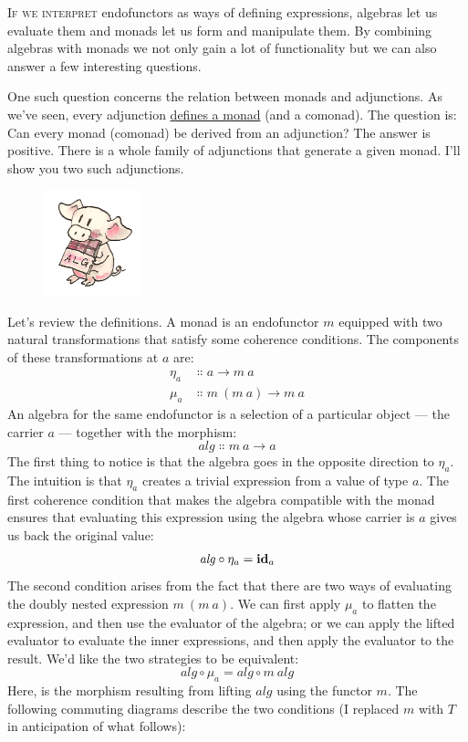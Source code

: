 
\lettrine[lhang=0.17]{I}{f we interpret} endofunctors as ways of defining expressions, algebras
let us evaluate them and monads let us form and manipulate them. By
combining algebras with monads we not only gain a lot of functionality
but we can also answer a few interesting questions.

One such question concerns the relation between monads and adjunctions.
As we've seen, every adjunction \hyperref[monads-categorically]{defines
  a monad} (and a comonad). The question is: Can every monad (comonad) be
derived from an adjunction? The answer is positive. There is a whole
family of adjunctions that generate a given monad. I'll show you two
such adjunctions.

\begin{figure}[H]
  \centering
  \includegraphics[width=0.25\textwidth]{images/pigalg.png}
\end{figure}

\noindent
Let's review the definitions. A monad is an endofunctor $m$
equipped with two natural transformations that satisfy some coherence
conditions. The components of these transformations at $a$ are:
\begin{align*}
  \eta_a & \Colon a \to m\ a         \\
  \mu_a  & \Colon m\ (m\ a) \to m\ a
\end{align*}
An algebra for the same endofunctor is a selection of a particular
object --- the carrier $a$ --- together with the morphism:
\[\mathit{alg} \Colon m\ a \to a\]
The first thing to notice is that the algebra goes in the opposite
direction to $\eta_a$. The intuition is that $\eta_a$ creates a
trivial expression from a value of type $a$. The first coherence
condition that makes the algebra compatible with the monad ensures that
evaluating this expression using the algebra whose carrier is $a$
gives us back the original value:
\[\mathit{alg} \circ \eta_a = \mathbf{id}_a\]
The second condition arises from the fact that there are two ways of
evaluating the doubly nested expression $m\ (m\ a)$. We can first
apply $\mu_a$ to flatten the expression, and then use the evaluator
of the algebra; or we can apply the lifted evaluator to evaluate the
inner expressions, and then apply the evaluator to the result. We'd like
the two strategies to be equivalent:
\[\mathit{alg} \circ \mu_a = \mathit{alg} \circ m\ \mathit{alg}\]
Here,  is the morphism resulting from lifting
$\mathit{alg}$ using the functor $m$. The following commuting
diagrams describe the two conditions (I replaced $m$ with
$T$ in anticipation of what follows):

